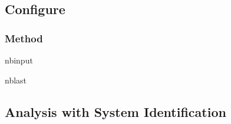 \documentclass[letterpaper,10pt,english]{sphinxmanual}
\begin{document}
\subsection{Configure}
\label{\detokenize{examples/04_MIMO_Intro:Configure}}

\subsubsection{Method}
\label{\detokenize{examples/04_MIMO_Intro:Method}}
\begin{sphinxuseclass}{nbinput}
\begin{sphinxuseclass}{nblast}
{
\begin{sphinxVerbatim}[commandchars=\\\{\}]
\llap{\color{nbsphinxin}[7]:\,\hspace{\fboxrule}\hspace{\fboxsep}}  
  
  
\end{sphinxVerbatim}
}

\end{sphinxuseclass}
\end{sphinxuseclass}

\subsection{Analysis with System Identification}
\label{\detokenize{examples/04_MIMO_Intro:Analysis-with-System-Identification}}
\end{document}
